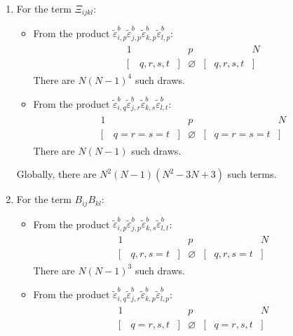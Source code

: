 \documentclass[12pt]{scrartcl}
\begin{document}
\begin{enumerate}
\item For the term $\Xi_{ijkl}$:
\begin{itemize}
\item From the product $\widetilde{\varepsilon}^b_{i,p} \widetilde{\varepsilon}^b_{j,p} \widetilde{\varepsilon}^b_{k,p} \widetilde{\varepsilon}^b_{l,p}$:
\begin{align}
\begin{array}{ccccccc}
1 & & & p & & & N \\
\big[ & q,r,s,t & \big] & \varnothing & \big[ & q,r,s,t & \big] \nonumber
\end{array}
\end{align}
There are $N(N-1)^4$ such draws.
\item From the product $\widetilde{\varepsilon}^b_{i,q} \widetilde{\varepsilon}^b_{j,r} \widetilde{\varepsilon}^b_{k,s} \widetilde{\varepsilon}^b_{l,t}$:
\begin{align}
\begin{array}{ccccccc}
1 & & &  p & & & N \\
\big[ & q=r=s=t & \big] & \varnothing & \big[ & q=r=s=t & \big] \nonumber
\end{array}
\end{align}
There are $N(N-1)$ such draws.
\end{itemize}
Globally, there are $N^2(N-1)(N^2-3N+3)$ such terms.
\item For the term $B_{ij}B_{kl}$:
\begin{itemize}
\item From the product $\widetilde{\varepsilon}^b_{i,p} \widetilde{\varepsilon}^b_{j,p} \widetilde{\varepsilon}^b_{k,s} \widetilde{\varepsilon}^b_{l,t}$:
\begin{align}
\begin{array}{ccccccc}
1 & & & p & & & N \\
\big[ & q,r,s=t & \big] & \varnothing & \big[ & q,r,s=t & \big] \nonumber
\end{array}
\end{align}
There are $N(N-1)^3$ such draws.
\item From the product $\widetilde{\varepsilon}^b_{i,q} \widetilde{\varepsilon}^b_{j,r} \widetilde{\varepsilon}^b_{k,p} \widetilde{\varepsilon}^b_{l,p}$:
\begin{align}
\begin{array}{ccccccc}
1 & & & p & & & N \\
\big[ & q=r,s,t & \big] & \varnothing & \big[ & q=r,s,t & \big] \nonumber

\end{array}
\end{align}
\end{itemize}
\end{enumerate}
\end{document}

